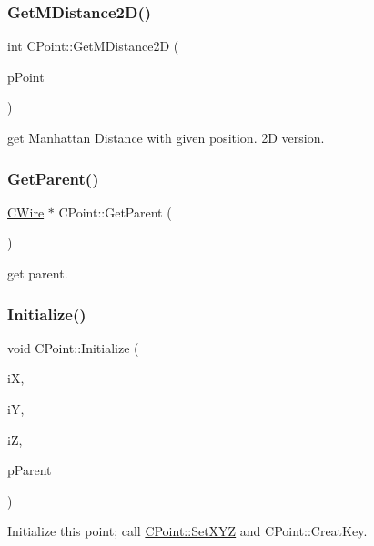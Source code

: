 \subsubsection{\texorpdfstring{GetMDistance2D()}{GetMDistance2D()}}
{\footnotesize\ttfamily int C\+Point\+::\+Get\+M\+Distance2D (\begin{DoxyParamCaption}\item[{\mbox{\hyperlink{classCPoint}{C\+Point}} $\ast$}]{p\+Point }\end{DoxyParamCaption})}



get Manhattan Distance with given position. 2D version. 

\mbox{\label{classCPoint_ac87cc89b531011be9c848630da1343b7}} 
\subsubsection{\texorpdfstring{GetParent()}{GetParent()}}
{\footnotesize\ttfamily \mbox{\hyperlink{classCWire}{C\+Wire}} $\ast$ C\+Point\+::\+Get\+Parent (\begin{DoxyParamCaption}{ }\end{DoxyParamCaption})}



get parent. 

\mbox{\label{classCPoint_a763a48a1efdcdaea63cfa4a9be8c4c48}} 
\subsubsection{\texorpdfstring{Initialize()}{Initialize()}}
{\footnotesize\ttfamily void C\+Point\+::\+Initialize (\begin{DoxyParamCaption}\item[{int}]{iX,  }\item[{int}]{iY,  }\item[{int}]{iZ,  }\item[{\mbox{\hyperlink{classCWire}{C\+Wire}} $\ast$}]{p\+Parent }\end{DoxyParamCaption})\hspace{0.3cm}{\ttfamily [virtual]}}

Initialize this point; call \mbox{\hyperlink{classCPoint_ae8364b4fc6b31f4a844f38a13f2251c7}{C\+Point\+::\+Set\+X\+YZ}} and C\+Point\+::\+Creat\+Key. \mbox{\label{classCPoint_a8177f7cd02cfad8b3ac91ebf0b7c8eee}} 
